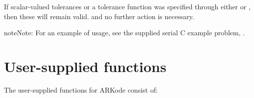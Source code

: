 \documentclass[letterpaper,10pt,english]{sphinxmanual}
\begin{document}
If scalar-valued tolerances or a tolerance function was specified
through either {\hyperref[c_interface/User_callable:c.ARKodeSStolerances]{\emph{}}} or
{\hyperref[c_interface/User_callable:c.ARKodeWFtolerances]{\emph{}}}, then these will remain valid. and no
further action is necessary.

\begin{notice}{note}{Note:}
For an example of {\hyperref[c_interface/User_callable:c.ARKodeResize]{\emph{}}} usage, see the
supplied serial C example problem, .
\end{notice}


\section{User-supplied functions}
\label{c_interface/User_supplied:cinterface-usersupplied}\label{c_interface/User_supplied:user-supplied-functions}\label{c_interface/User_supplied::doc}
The user-supplied functions for ARKode consist of:
\end{document}
